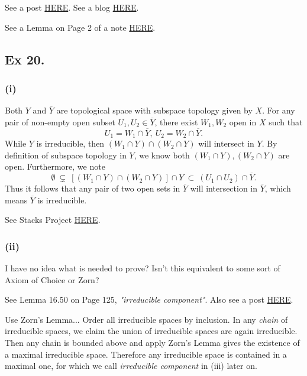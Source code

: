 See a post \href{https://math.stackexchange.com/questions/541943/spectrum-of-a-ring-is-irreducible-if-and-only-if-nilradical-is-prime-atiyah-mac}{HERE}.
See a blog \href{https://mathstrek.blog/2020/04/01/commutative-algebra-14/}{HERE}.

See a Lemma on Page 2 of a note \href{https://ocw.mit.edu/courses/18-726-algebraic-geometry-spring-2009/3723a99e97b581828fd782b9ffd83921_MIT18_726s09_lec11_more_schemes.pdf}{HERE}.



\subsection{Ex 20.}\label{Atiyah Chapter 1 Ex 20.}

\subsubsection{(i)}
Both $Y$ and $\overline{Y}$ are topological space with subspace topology given by $X$.
For any pair of non-empty open subset $U_1,U_2\in\overline{Y}$, there exist $W_1,W_2$ open in $X$ such that $$U_1=W_1\cap\overline{Y},~ U_2=W_2\cap\overline{Y}.$$
While $Y$ is irreducible, then $(W_1\cap Y)\cap (W_2\cap Y)$ will intersect in $Y$. By definition of subspace topology in $Y$, we know both $(W_1\cap Y),(W_2\cap Y)$ are open. Furthermore, we note
$$\emptyset~\subsetneq~[(W_1\cap Y)\cap(W_2\cap Y)]\cap Y ~\subset~ (U_1\cap U_2)\cap \overline{Y}.$$ Thus it follows that any pair of two open sets in $\overline{Y}$ will intersection in $\overline{Y}$, which means $\overline{Y}$ is irreducible.

See Stacks Project \href{https://stacks.math.columbia.edu/tag/004U}{HERE}.

\subsubsection{(ii)}

I have no idea what is needed to prove? Isn't this equivalent to some sort of Axiom of Choice or Zorn?

See \cite{altman} Lemma 16.50 on Page 125, \textit{"irreducible component"}. Also see a post \href{https://math.stackexchange.com/questions/1809159/show-every-irreducible-subset-of-a-topological-space-x-is-contained-in-a-maxim}{HERE}.

Use Zorn's Lemma... 
Order all irreducible spaces by inclusion. In any \textit{chain} of irreducible spaces, we claim the union of irreducible spaces are again irreducible. Then any chain is bounded above and apply Zorn's Lemma gives the existence of a maximal irreducible space. Therefore any irreducible space is contained in a maximal one, for which we call \textit{irreducible component} in (iii) later on.

